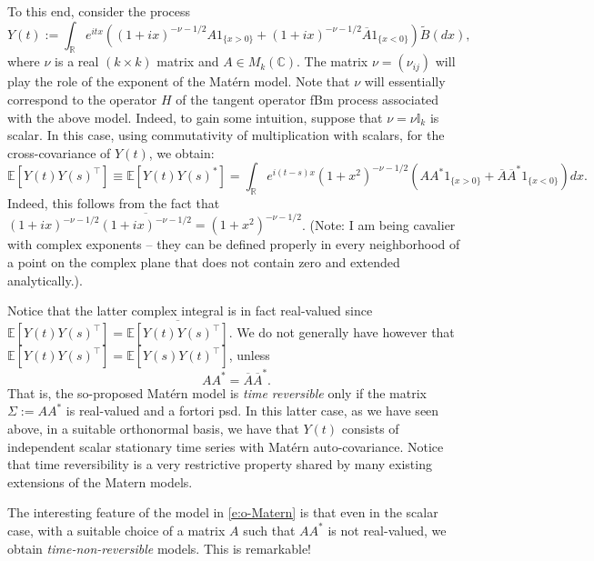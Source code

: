 \documentclass[11pt]{article}
\def\E{\mathbb E}
\def\C{\mathbb C}
\def\I{\mathbb I}
\def\R{\mathbb R}
\theoremstyle{plain}
\theoremstyle{definition}
\theoremstyle{condition}
\theoremstyle{remark}
\begin{document}
   To this end, consider the process
   \begin{equation}\label{e:o-Matern}
   Y(t):= \int_{\R} e^{itx} ( (1+ix)^{-\nu -1/2}A 1_{\{x>0\}} + (1+ix)^{-\nu - 1/2}\overline{A}1_{\{x<0\}}) \tilde B(dx),
   \end{equation}
   where $\nu$ is a real $(k\times k)$ matrix and $A\in M_k(\C)$.  The matrix $\nu = (\nu_{ij})$ will play the role of the exponent of the Mat\'ern model.  
    Note that $\nu$ will essentially correspond to the operator $H$ of the tangent operator fBm process associated with the above model.  Indeed, to 
    gain some intuition, suppose that $\nu = \nu \I_k$ is scalar.  In this case, using commutativity of multiplication with scalars, for the cross-covariance of $Y(t)$, we obtain:
    \begin{equation}\label{e:o-Matern-spectral}
    \E [Y(t) Y(s)^\top] \equiv \E [Y(t) Y(s)^*] = \int_{\R} e^{i(t-s)x} (1+x^2)^{-\nu-1/2}  (A A^*1_{\{ x>0\} } + \overline A\overline A^*1_{\{ x<0\} }) dx.
   \end{equation}
   Indeed, this follows from the fact that $(1+ix)^{-\nu-1/2} \overline{(1+ix)^{-\nu-1/2}} = (1+ x^2)^{-\nu-1/2}$.  
   (Note: I am being cavalier with complex exponents -- they can be defined properly in every neighborhood of  
   a point on the complex plane that does not contain zero and extended analytically.).  
   
    Notice that the latter complex integral is in fact real-valued since  $\E [Y(t) Y(s)^\top] = \overline{\E[Y(t)Y(s)^\top]}$.
    We do not generally have however that $\E[Y(t) Y(s)^\top] = \E[Y(s)Y(t)^\top]$, unless
    $$
    A A^* =  \overline A\overline A^*.
    $$
    That is, the so-proposed Mat\'ern model is {\em time reversible} only if the matrix $\Sigma:= AA^*$ is real-valued and a fortori psd.
    In this latter case, as we have seen above, in a suitable orthonormal basis, we have that $Y(t)$ consists of independent scalar stationary time 
    series with Mat\'ern auto-covariance.  Notice that time reversibility is a very restrictive property shared by many existing extensions of the Matern models.
  
   The interesting feature of the  model  in \eqref{e:o-Matern} is that even in the scalar case, with a suitable choice of a matrix $A$ such that $A A^*$ is not real-valued,
   we obtain {\em time-non-reversible} models. This is remarkable! 
   
\end{document}
